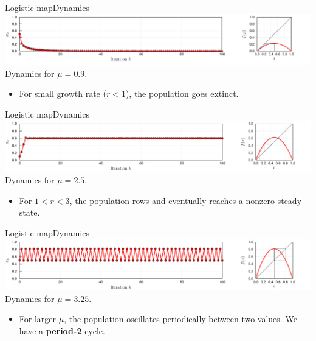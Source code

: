 \documentclass[usenames,dvipsnames,svgnames,10pt,aspectratio=169]{beamer}
\begin{document}
\begin{frame}[t, c]{Logistic map}{Dynamics}
	\centering
	\includegraphics[width=\textwidth]{dynamics_a} \\
	{
	\small
	Dynamics for \( \mu = 0.9 \).
	}

	\begin{itemize}
		\item For small growth rate (\( r < 1\)), the population goes extinct.
	\end{itemize}

	\vspace{1cm}
\end{frame}

\begin{frame}[t, c]{Logistic map}{Dynamics}
	\centering
	\includegraphics[width=\textwidth]{dynamics_b} \\
	{
	\small
	Dynamics for \( \mu = 2.5 \).
	}

	\begin{itemize}
		\item For \( 1 < r < 3 \), the population rows and eventually reaches a nonzero steady state.
	\end{itemize}

	\vspace{1cm}
\end{frame}

\begin{frame}[t, c]{Logistic map}{Dynamics}
	\centering
	\includegraphics[width=\textwidth]{dynamics_c} \\
	{
	\small
	Dynamics for \( \mu = 3.25 \).
	}

	\begin{itemize}
		\item For larger \( \mu	\), the population oscillates periodically between two values.
		We have a \textbf{period-2} cycle.
	\end{itemize}

	\vspace{1cm}
\end{frame}
\end{document}
